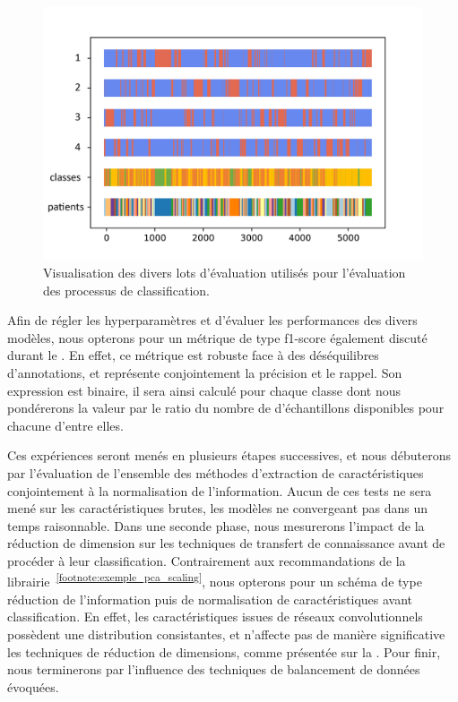 \begin{figure}[H]
    \centering
    \includegraphics[width=0.9\linewidth]{contents/chapter_4/resources/visualisation_folds.png}
    \caption{Visualisation des divers lots d'évaluation utilisés pour l'évaluation des processus de classification.}
    \label{fig:visualisation_folds}
\end{figure}\par

Afin de régler les hyperparamètres et d'évaluer les performances des divers modèles, nous opterons pour un métrique de type f1-score également discuté durant le . En effet, ce métrique est robuste face à des déséquilibres d'annotations, et représente conjointement la précision et le rappel. Son expression est binaire, il sera ainsi calculé pour chaque classe dont nous pondérerons la valeur par le ratio du nombre de d'échantillons disponibles pour chacune d'entre elles.\par

Ces expériences seront menés en plusieurs étapes successives, et nous débuterons par l'évaluation de l'ensemble des méthodes d'extraction de caractéristiques conjointement à la normalisation de l'information. Aucun de ces tests ne sera mené sur les caractéristiques brutes, les modèles ne convergeant pas dans un temps raisonnable. Dans une seconde phase, nous mesurerons l'impact de la réduction de dimension sur les techniques de transfert de connaissance avant de procéder à leur classification. Contrairement aux recommandations de la librairie~\textsuperscript{\ref{footnote:exemple_pca_scaling}}, nous opterons pour un schéma de type réduction de l'information puis de normalisation de caractéristiques avant classification. En effet, les caractéristiques issues de réseaux convolutionnels possèdent une distribution consistantes, et n'affecte pas de manière significative les techniques de réduction de dimensions, comme présentée sur la . Pour finir, nous
terminerons par l'influence des techniques de balancement de données évoquées.\par

